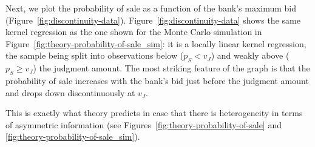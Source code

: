 \documentclass[11pt,twopage]{article}
\begin{document}
Next, we plot the probability of sale as a function of the bank's
maximum bid
(Figure~\ref{fig:discontinuity-data}). Figure~\ref{fig:discontinuity-data}
shows the same kernel regression as the one shown for the Monte Carlo
simulation in Figure~\ref{fig:theory-probability-of-sale_sim}: it is a
locally linear kernel regression, the sample being split into
observations below ($p_S<v_J$) and weakly above ($p_S\geq v_J$) the
judgment amount. The most striking feature of the graph is that the
probability of sale increases with the bank's bid just before the
judgment amount and drops down discontinuously at $v_J$.


This is exactly what theory predicts in case that there is
heterogeneity in terms of asymmetric information (see
Figures~\ref{fig:theory-probability-of-sale} and
\ref{fig:theory-probability-of-sale_sim}).


\end{document}
